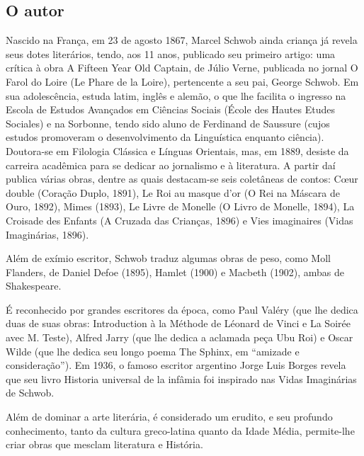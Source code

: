 \documentclass[12pt]{extarticle}
\begin{document}
\subsection{O autor}



Nascido na França, em 23 de agosto 1867, Marcel Schwob ainda criança já revela
seus dotes literários, tendo, aos 11 anos, publicado seu primeiro
artigo: uma crítica à obra A Fifteen Year Old Captain, de Júlio Verne,
publicada no jornal O Farol do Loire (Le Phare de la Loire), pertencente
a seu pai, George Schwob. Em sua adolescência, estuda latim, inglês e
alemão, o que lhe facilita o ingresso na Escola de Estudos Avançados em
Ciências Sociais (École des Hautes Etudes Sociales) e na Sorbonne, tendo
sido aluno de Ferdinand de Saussure (cujos estudos promoveram o
desenvolvimento da Linguística enquanto ciência). Doutora-se em
Filologia Clássica e Línguas Orientais, mas, em 1889, desiste da
carreira acadêmica para se dedicar ao jornalismo e à literatura. A
partir daí publica várias obras, dentre as quais destacam-se seis
coletâneas de contos: Cœur double (Coração Duplo, 1891), Le Roi au
masque d'or (O Rei na Máscara de Ouro, 1892), Mimes (1893), Le Livre de
Monelle (O Livro de Monelle, 1894), La Croisade des Enfants (A Cruzada
das Crianças, 1896) e Vies imaginaires (Vidas Imaginárias, 1896).




Além de exímio escritor, Schwob traduz algumas obras de peso, como Moll
Flanders, de Daniel Defoe (1895), Hamlet (1900) e Macbeth (1902), ambas
de Shakespeare.

É reconhecido por grandes escritores da época, como Paul Valéry (que lhe
dedica duas de suas obras: Introduction à la Méthode de Léonard de Vinci
e La Soirée avec M. Teste), Alfred Jarry (que lhe dedica a aclamada peça
Ubu Roi) e Oscar Wilde (que lhe dedica seu longo poema The Sphinx, em
``amizade e consideração''). Em 1936, o famoso escritor argentino Jorge
Luis Borges revela que seu livro Historia universal de la infâmia foi
inspirado nas Vidas Imaginárias de Schwob.




Além de dominar a arte literária, é considerado um erudito, e seu
profundo conhecimento, tanto da cultura greco-latina quanto da Idade
Média, permite-lhe criar obras que mesclam literatura e História.
\end{document}

